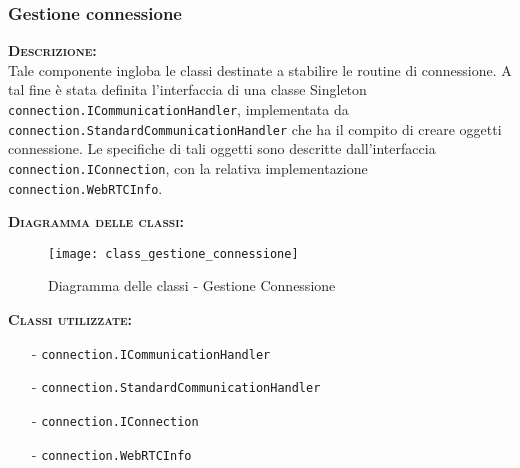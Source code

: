 \subsubsection{Gestione connessione}
\begin{description}
	\item{\scshape\bfseries Descrizione:}\\
Tale componente ingloba le classi destinate a stabilire le routine di connessione. A tal fine è stata definita l'interfaccia di una classe Singleton \texttt{connection.ICommunicationHandler}, implementata da \texttt{connection.StandardCommunicationHandler} che ha il compito di creare oggetti connessione. Le specifiche di tali oggetti sono descritte dall'interfaccia \texttt{connection.IConnection}, con la relativa implementazione \texttt{connection.WebRTCInfo}.
	\item{\scshape\bfseries Diagramma delle classi:}
	\begin{figure}[H]
\begin{center}
\texttt{[image: class\_gestione\_connessione]}
\caption{Diagramma delle classi - Gestione Connessione}\label{fig:gestione_connessione}
\end{center}
\end{figure}
	
	\item{\scshape\bfseries Classi utilizzate:}
	\begin{itemize}[nolistsep, noitemsep]
	  \item[-] \texttt{connection.ICommunicationHandler}
	  \item[-] \texttt{connection.StandardCommunicationHandler}
	  \item[-] \texttt{connection.IConnection}
	  \item[-] \texttt{connection.WebRTCInfo}
	\end{itemize}
\end{description}

